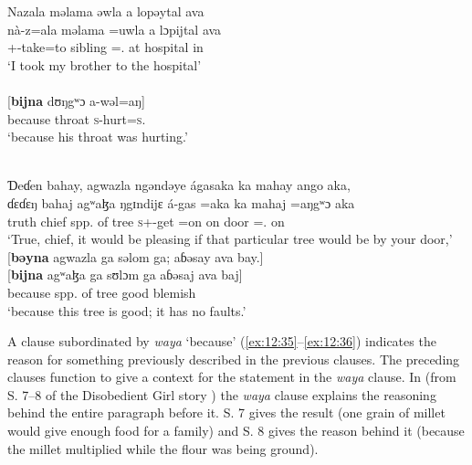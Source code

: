 \ea \label{ex:12:33}
Nazala  məlama  əwla  a  lopəytal  ava\\  
\gll  nà-z=ala    məlama  =uwla    a  lɔpijtal  ava \\ 
      {\oneS}+{\PFV}-take=to  sibling  ={\oneS}.{\POSS}  at  hospital  in \\ 
\glt ‘I took my brother to the hospital’\\
      
      \\      
\gll {}[\textbf{bijna}  dʊŋgʷɔ   a-wəl=aŋ]\\
     because  throat  \textsc{s}-hurt=\textsc{s}.{\IO}\\
\glt  ‘because his throat was hurting.’ 
\z 

\ea \label{ex:12:34}
\\
Ɗeɗen  bahay,  agwazla  ngəndəye  ágasaka  ka  mahay  ango  aka,\\  
\gll  ɗɛɗɛŋ  bahaj  agʷaɮa  ŋgɪndijɛ  á-gas =aka  ka  mahaj  =aŋgʷɔ aka\\ 
      truth  chief {spp. of tree} {\DEM} \textsc{s}+{\IFV}-get =on  on  door ={\twoS}.{\POSS}  on \\ 
\glt ‘True, chief, it would be pleasing if that particular tree would be by your door,’\\      
      
      \medskip
 {}[\textbf{bəyna}  agwazla  ga  səlom  ga; aɓəsay  ava  bay.]\\     
\gll {}[\textbf{bijna} agʷaɮa ga sʊlɔm ga aɓəsaj ava baj]\\      
     because {spp. of tree}  {\ADJ} good  {\ADJ}   blemish   {\EXT}  {\NEG}\\ 
\glt  ‘because this tree is good;  it has no faults.’
\z 

\largerpage
A clause subordinated by \textit{waya} ‘because’ (\ref{ex:12:35}{}--\ref{ex:12:36}) indicates the reason for something previously described in the previous clauses. The preceding clauses function to give a context for the statement in the \textit{waya} clause. In  (from S. 7--8 of the Disobedient Girl story ) the \textit{waya} clause explains the reasoning behind the entire paragraph before it. S. 7 gives the result (one grain of millet would give enough food for a family) and S. 8 gives the reason behind it (because the millet multiplied while the flour was being ground).

